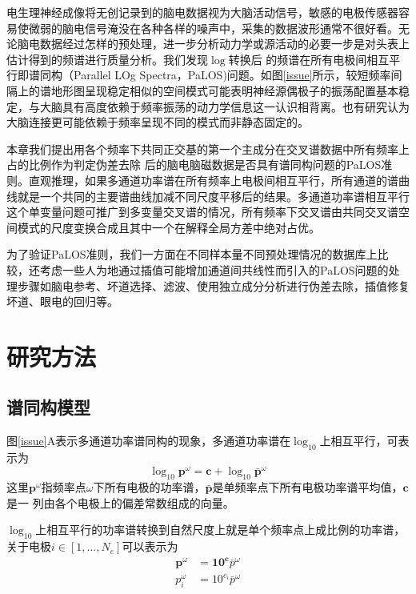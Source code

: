 电生理神经成像将无创记录到的脑电数据视为大脑活动信号，敏感的电极传感器容易使微弱的脑电信号淹没在各种各样的噪声中，采集的数据波形通常不很好看。无论脑电数据经过怎样的预处理，进一步分析动力学或源活动的必要一步是对头表上估计得到的频谱进行质量分析。我们发现$\log$转换后
的频谱在所有电极间相互平行即谱同构（Parallel LOg Spectra，PaLOS)问题。如图\ref{issue}所示，较短频率间隔上的谱地形图呈现稳定相似的空间模式可能表明神经源偶极子的振荡配置基本稳定，与大脑具有高度依赖于频率振荡的动力学信息这一认识相背离。也有研究认为大脑连接更可能依赖于频率呈现不同的模式而非静态固定的。

本章我们提出用各个频率下共同正交基的第一个主成分在交叉谱数据中所有频率上占的比例作为判定伪差去除
后的脑电脑磁数据是否具有谱同构问题的PaLOS准则。直观推理，如果多通道功率谱在所有频率上电极间相互平行，所有通道的谱曲线就是一个共同的主要谱曲线加减不同尺度平移后的结果。多通道功率谱相互平行这个单变量问题可推广到多变量交叉谱的情况，所有频率下交叉谱由共同交叉谱空间模式的尺度变换合成且其中一个在解释全局方差中绝对占优。

为了验证PaLOS准则，我们一方面在不同样本量不同预处理情况的数据库上比较，还考虑一些人为地通过插值可能增加通道间共线性而引入的PaLOS问题的处理步骤如脑电参考、坏道选择、滤波、使用独立成分分析进行伪差去除，插值修复坏道、眼电的回归等。 

\section{研究方法}
\subsection{谱同构模型}
图\ref{issue}A表示多通道功率谱同构的现象，多通道功率谱在$\log_{10}$上相互平行，可表示为
\begin{equation}\label{eq1}
\log_{10}\mathbf{p}^\omega=\mathbf{c}+\log_{10}\bar{\mathbf{p}}^\omega
\end{equation}
这里$\mathbf{p}^\omega$指频率点$\omega$下所有电极的功率谱，$\bar{\mathbf{p}}$是单频率点下所有电极功率谱平均值，$\mathbf{c}$是一
列由各个电极上的偏差常数组成的向量。

$\log_{10}$上相互平行的功率谱转换到自然尺度上就是单个频率点上成比例的功率谱，关于电极$i\in[1,...,N_e]$可以表示为
\begin{equation}\label{eq2}
\begin{aligned}
\mathbf{p}^\omega& =\mathbf{10^c}\bar{p}^\omega\\
p_i^\omega& =10^{c_i}\bar{p}^\omega
\end{aligned}
\end{equation}

